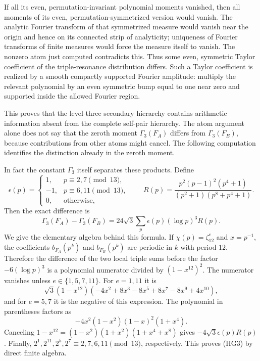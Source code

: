 \documentclass[11pt]{article}
\numberwithin{equation}{section}
\theoremstyle{remark}
\begin{document}
If all its even, permutation-invariant polynomial moments vanished,
then all moments of its even, permutation-symmetrized version would
vanish.  The analytic Fourier transform of that symmetrized measure
would vanish near the origin and hence on its connected strip of
analyticity; uniqueness of Fourier transforms of finite measures would
force the measure itself to vanish.  The nonzero atom just computed
contradicts this.  Thus some even, symmetric Taylor coefficient of the
triple-resonance distribution differs.  Such a Taylor coefficient is
realized by a smooth compactly supported Fourier amplitude: multiply
the relevant polynomial by an even symmetric bump equal to one near
zero and supported inside the allowed Fourier region.

This proves that the level-three secondary hierarchy contains arithmetic
information absent from the complete self-pair hierarchy.  The atom
argument alone does not say that the zeroth moment $\Gamma_3(F_A)$ differs
from $\Gamma_3(F_B)$, because contributions from other atoms might cancel.
The following computation identifies the distinction already in the zeroth moment.

In fact the constant $\Gamma_3$ itself separates these products.  Define
\[
 \epsilon(p)=\begin{cases}
  1,&p\equiv2,7\pmod{13},\\
 -1,&p\equiv6,11\pmod{13},\\
  0,&\text{otherwise},
 \end{cases}
 \qquad
 R(p)=\frac{p^2(p-1)^2(p^4+1)}{(p^2+1)(p^8+p^4+1)}.
\]
Then the exact difference is
\[
 \Gamma_3(F_A)-\Gamma_3(F_B)
   =24\sqrt3\sum_p\epsilon(p)(\log p)^3R(p). \tag{HG3}
\]
We give the elementary algebra behind this formula.  If
$\chi(p)=\zeta_{12}^e$ and $x=p^{-1}$, the coefficients
$b_{F_A}(p^k)$ and $b_{F_B}(p^k)$ are periodic in $k$ with period $12$.
Therefore the difference of the two local triple sums before the
factor $-6(\log p)^3$ is a polynomial numerator divided by
$(1-x^{12})^2$.  The numerator vanishes unless
$e\in\{1,5,7,11\}$.  For $e=1,11$ it is
\[
 \sqrt3(1-x^{12})
       (-4x^2+8x^3-8x^5+8x^7-8x^9+4x^{10}),
\]
and for $e=5,7$ it is the negative of this expression.  The polynomial
in parentheses factors as
\[
 -4x^2(1-x^2)(1-x)^2(1+x^4).
\]
Canceling $1-x^{12}=(1-x^2)(1+x^2)(1+x^4+x^8)$ gives
$-4\sqrt3\epsilon(p)R(p)$.  Finally,
$2^1,2^{11},2^5,2^7\equiv2,7,6,11\pmod{13}$, respectively.
This proves (HG3) by direct finite algebra.
\end{document}
